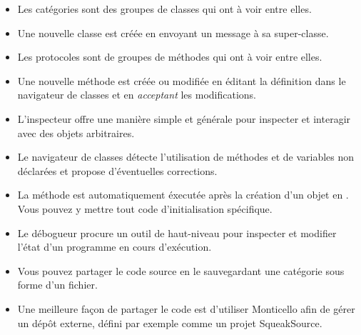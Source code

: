 \documentclass[a4paper,10pt,twoside]{book}
\begin{document}
\begin{itemize}
  \item Les catégories sont des groupes de classes qui ont à voir entre elles.
  \item Une nouvelle classe est créée en envoyant un message à sa super-classe.
  \item Les protocoles sont de groupes de méthodes qui ont à voir entre elles.
  \item Une nouvelle méthode est créée ou modifiée en éditant la définition dans le navigateur de classes et en \emph{acceptant} les modifications.
  \item L'inspecteur offre une manière simple et générale pour inspecter et interagir avec des objets arbitraires.
  \item Le navigateur de classes détecte l'utilisation de méthodes et de variables non déclarées et propose d'éventuelles corrections.
  \item La méthode  est automatiquement éxecutée après la création d'un objet en \squeak. Vous pouvez y mettre tout code d'initialisation spécifique.
  \item Le débogueur procure un outil de haut-niveau pour inspecter et modifier l'état d'un programme en cours d'ex\'ecution.
  \item Vous pouvez partager le code source en le sauvegardant une catégorie sous forme d'un fichier.
  \item Une meilleure façon de partager le code est d'utiliser Monticello afin de gérer un dépôt externe, défini par exemple comme un projet SqueakSource.
\end{itemize}

\ifx\wholebook\relax\else
\end{document}
